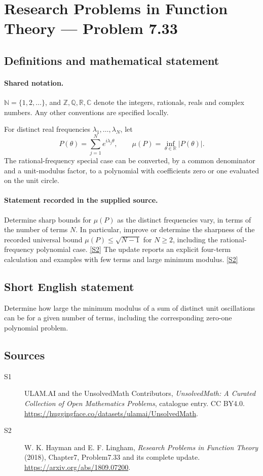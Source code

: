 \documentclass[11pt]{article}
\newcommand{\sref}[2]{\hyperlink{source:#1:#2}{[S#2]}}
\begin{document}
\section{Research Problems in Function Theory — Problem 7.33}\label{statement}

\subsection{Definitions and mathematical statement}

\paragraph{Shared notation.}$\mathbb N=\{1,2,\ldots\}$, and $\mathbb Z,\mathbb Q,\mathbb R,\mathbb C$ denote the integers, rationals, reals and complex numbers. Any other conventions are specified locally.


For distinct real frequencies $\lambda_1,\ldots,\lambda_N$, let
\[P(\theta)=\sum_{j=1}^N e^{i\lambda_j\theta},\qquad
\mu(P)=\inf_{\theta\in\mathbb R}|P(\theta)|.\]
The rational-frequency special case can be converted, by a common denominator and a unit-modulus factor, to a polynomial with coefficients zero or one evaluated on the unit circle.

\paragraph{Statement recorded in the supplied source.}
Determine sharp bounds for $\mu(P)$ as the distinct frequencies vary, in terms of the number of terms $N$. In particular, improve or determine the sharpness of the recorded universal bound $\mu(P)\le\sqrt{N-1}$ for $N\ge2$, including the rational-frequency polynomial case. \sref{statement}{2}
The update reports an explicit four-term calculation and examples with few terms and large minimum modulus. \sref{statement}{2}
\subsection{Short English statement}
Determine how large the minimum modulus of a sum of distinct unit oscillations can be for a given number of terms, including the corresponding zero-one polynomial problem.
\subsection{Sources}
\begin{description}
\item[\hypertarget{source:statement:1}{S1}] ULAM.AI and the UnsolvedMath Contributors, \emph{UnsolvedMath: A Curated Collection of Open Mathematics Problems}, catalogue entry. CC BY4.0. \url{https://huggingface.co/datasets/ulamai/UnsolvedMath}.
\item[\hypertarget{source:statement:2}{S2}] W. K. Hayman and E. F. Lingham, \emph{Research Problems in Function Theory} (2018), Chapter7, Problem7.33 and its complete update. \url{https://arxiv.org/abs/1809.07200}.
\end{description}
\label{end:statement}
\end{document}
